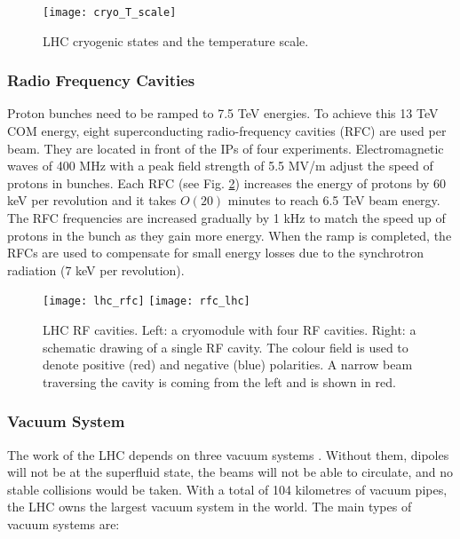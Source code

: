 \begin{normalsize}
\begin{figure}[H]
  \centering
  \texttt{[image: cryo\_T\_scale]}
  \caption{LHC cryogenic states and the temperature scale.}
  \label{cryo_T_scale}
\end{figure}




\subsubsection{Radio Frequency Cavities}\label{sec:rf}


Proton bunches need to be ramped to 7.5 TeV energies. To achieve this 13 TeV COM energy, eight superconducting radio-frequency cavities (RFC) are used per beam. They are located in front of the IPs of four experiments. Electromagnetic waves of 400 MHz with a peak field strength of 5.5 MV/m adjust the speed of protons in bunches. Each RFC (see Fig. \ref{lhc_rfc}) increases the energy of protons by 60 keV per revolution and it takes $O(20)$ minutes to reach 6.5 TeV beam energy. The RFC frequencies are increased gradually by 1 kHz to match the speed up of protons in the bunch as they gain more energy. When the ramp is completed, the RFCs are used to compensate for small energy losses due to the synchrotron radiation (7 keV per revolution). 




\begin{figure}[H]
\centering
\texttt{[image: lhc\_rfc]}
\texttt{[image: rfc\_lhc]}
\caption[RF cavities module.]{LHC RF cavities. Left: a cryomodule with four RF cavities. Right: a schematic drawing of a single RF cavity. The colour field is used to denote positive (red) and negative (blue) polarities. A narrow beam traversing the cavity is coming from the left and is shown in red. }
\label{lhc_rfc}
\end{figure}




\subsubsection{Vacuum System}\label{sec:vacuum}



The work of the LHC depends on three vacuum systems \cite{LHC_vacuum}. Without them, dipoles will not be at the superfluid state, the beams will not be able to circulate, and no stable collisions would be taken. With a total of 104 kilometres of vacuum pipes, the LHC owns the largest vacuum system in the world. The main types of vacuum systems are:


\end{normalsize}

